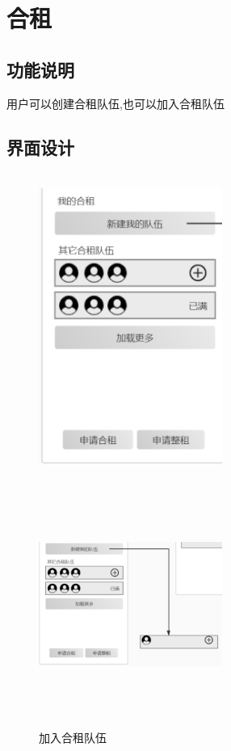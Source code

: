 \section{合租}

\subsection{功能说明}
用户可以创建合租队伍,也可以加入合租队伍
\subsection{界面设计}
\begin{figure}[htbp]
    \centering
    \begin{minipage}[t]{0.48\textwidth}
    \centering
    \includegraphics[width=6cm,height=10cm]{design/image/ui9.png} 
    \caption{}
    \end{minipage}
    \begin{minipage}[t]{0.48\textwidth}
    \centering
    \includegraphics[width=6cm,height=8cm]{design/image/ui6.png}
    \caption{加入合租队伍}
    \end{minipage}
    \end{figure}
\newpage
